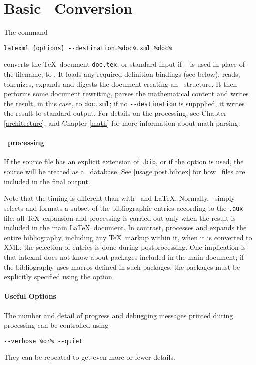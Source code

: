 \documentclass{book}
\newcommand{\shellcode}{\lstinline[style=shell]}
\begin{document}
\section[Conversion]{Basic \XML\ Conversion}\label{usage.conversion}
The command
\begin{lstlisting}[style=shell]
latexml {options} --destination=%doc%.xml %doc%
\end{lstlisting}
converts the \TeX\ document \texttt{doc.tex},
or standard input if \texttt{-} is used in place of the filename, to \XML.
It loads any required definition bindings (see below),
reads, tokenizes, expands and digests the document creating an \XML\ structure.
It then performs some document rewriting, parses the mathematical content
and writes the result, in this case, to \texttt{doc.xml};
if no \shellcode|--destination| is suppplied, it writes the result to standard output.
For details on the processing, see Chapter \ref{architecture},
and Chapter \ref{math} for more information about math parsing.

\paragraph{\BibTeX\ processing}\label{usage.conversion.bibtex}
If the source file has an explicit extension of \texttt{.bib},
or if the  option is used, the source will be
treated as a \BibTeX\ database.  See \ref{usage.post.bibtex}
for how \BibTeX\ files are included in the final output.

\begin{advanced}
Note that the timing is different than with \BibTeX\ and \LaTeX.
Normally, \BibTeX\ simply selects and formats a subset of the
bibliographic entries according to the \texttt{.aux} file;
all \TeX\ expansion and processing is carried out only when
the result is included in the main \LaTeX\ document.
In contrast,  processes and expands
the entire bibliography, including any \TeX\ markup within it,
when it is converted to XML;
the selection of entries is done during postprocessing.
One implication is that latexml does not know about packages
included in the main document; if the bibliography uses
macros defined in such packages, the packages must be explicitly
specified using the  option.
\end{advanced}

\paragraph{Useful Options}\label{usage.conversion.options}
The number and detail of progress and debugging messages printed
during processing can be controlled using
\begin{lstlisting}[style=shell]
--verbose %or% --quiet
\end{lstlisting}
They can  be repeated to get even more or fewer details.
\end{document}
